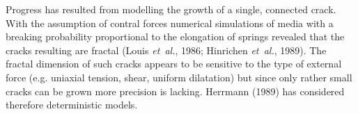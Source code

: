 \begin{appendix}
Progress has resulted from modelling the growth of a single, connected
crack. With the assumption of contral forces numerical simulations of
media with a breaking probability proportional to the elongation of
springs revealed that the cracks resulting are fractal (Louis {\it
et~al.}, 1986; Hinrichen {\it et~al.}, 1989). The fractal dimension of
such cracks appears to be sensitive to the type of external force
(e.g. uniaxial tension, shear, uniform dilatation) but since only
rather small cracks can be grown more precision is lacking. Herrmann
(1989) has considered therefore deterministic models.

\end{appendix}

